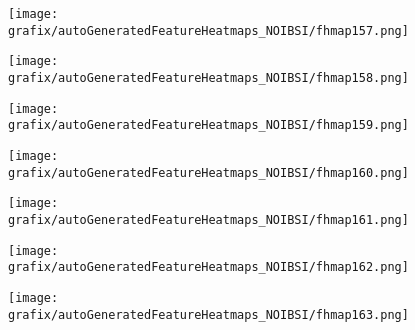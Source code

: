 \hspace{\hsp} 
\begin{subfigure}{\wid\textwidth} 
    \centering 
    \caption{\tiny \sffamily {}} 
    \vspace{\vsp} 
    \texttt{[image: grafix/autoGeneratedFeatureHeatmaps\_NOIBSI/fhmap157.png]} 
\end{subfigure} 
\hspace{\hsp} 
\begin{subfigure}{\wid\textwidth} 
    \centering 
    \caption{\tiny \sffamily {}} 
    \vspace{\vsp} 
    \texttt{[image: grafix/autoGeneratedFeatureHeatmaps\_NOIBSI/fhmap158.png]} 
\end{subfigure} 
\hspace{\hsp} 
\begin{subfigure}{\wid\textwidth} 
    \centering 
    \caption{\tiny \sffamily {}} 
    \vspace{\vsp} 
    \texttt{[image: grafix/autoGeneratedFeatureHeatmaps\_NOIBSI/fhmap159.png]} 
\end{subfigure} 
\hspace{\hsp} 
\begin{subfigure}{\wid\textwidth} 
    \centering 
    \caption{\tiny \sffamily {}} 
    \vspace{\vsp} 
    \texttt{[image: grafix/autoGeneratedFeatureHeatmaps\_NOIBSI/fhmap160.png]} 
\end{subfigure} 
\hspace{\hsp} 
\begin{subfigure}{\wid\textwidth} 
    \centering 
    \caption{\tiny \sffamily {}} 
    \vspace{\vsp} 
    \texttt{[image: grafix/autoGeneratedFeatureHeatmaps\_NOIBSI/fhmap161.png]} 
\end{subfigure} 
\hspace{\hsp} 
\begin{subfigure}{\wid\textwidth} 
    \centering 
    \caption{\tiny \sffamily {}} 
    \vspace{\vsp} 
    \texttt{[image: grafix/autoGeneratedFeatureHeatmaps\_NOIBSI/fhmap162.png]} 
\end{subfigure} 
\hspace{\hsp} 
\begin{subfigure}{\wid\textwidth} 
    \centering 
    \caption{\tiny \sffamily {}} 
    \vspace{\vsp} 
    \texttt{[image: grafix/autoGeneratedFeatureHeatmaps\_NOIBSI/fhmap163.png]} 
\end{subfigure} 
